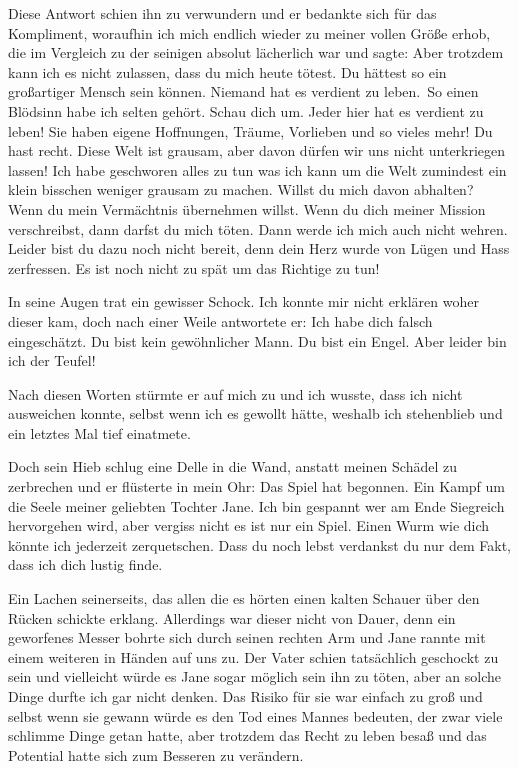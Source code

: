 \documentclass[11pt, a5paper]{article}
\newcommand{\te}{Jane } %
\newcommand{\Te}{Jane} %
\newcommand{\nL}{Niemand hat es verdient zu leben.}
\begin{document}
\begin{spacing}{1.2}
		 Diese Antwort schien ihn zu verwundern und er bedankte sich für das Kompliment, woraufhin ich mich endlich wieder zu meiner vollen Größe erhob, die im Vergleich zu der seinigen absolut lächerlich war und sagte: \frqq Aber trotzdem kann ich es nicht zulassen, dass du mich heute tötest. Du hättest so ein großartiger Mensch sein können. \nL\ So einen Blödsinn habe ich selten gehört. Schau dich um. Jeder hier hat es verdient zu leben! Sie haben eigene Hoffnungen, Träume, Vorlieben und so vieles mehr! Du hast recht. Diese Welt ist grausam, aber davon dürfen wir uns nicht unterkriegen lassen! Ich habe geschworen alles zu tun was ich kann um die Welt zumindest ein klein bisschen weniger grausam zu machen. Willst du mich davon abhalten? Wenn du mein Vermächtnis übernehmen willst. Wenn du dich meiner Mission verschreibst, dann darfst du mich töten. Dann werde ich mich auch nicht wehren. Leider bist du dazu noch nicht bereit, denn dein Herz wurde von Lügen und Hass zerfressen. Es ist noch nicht zu spät um das Richtige zu tun!\flqq
		 
		 In seine Augen trat ein gewisser Schock. Ich konnte mir nicht erklären woher dieser kam, doch nach einer Weile antwortete er: \frqq Ich habe dich falsch eingeschätzt. Du bist kein gewöhnlicher Mann. Du bist ein Engel. Aber leider bin ich der Teufel!\flqq
		 
		 Nach diesen Worten stürmte er auf mich zu und ich wusste, dass ich nicht  ausweichen konnte, selbst wenn ich es gewollt hätte, weshalb ich stehenblieb und ein letztes Mal tief einatmete.
		 
		 Doch sein Hieb schlug eine Delle in die Wand, anstatt meinen Schädel zu zerbrechen und er flüsterte in mein Ohr: \frqq Das Spiel hat begonnen. Ein Kampf um die Seele meiner geliebten Tochter \Te . Ich bin gespannt wer am Ende Siegreich hervorgehen wird, aber vergiss nicht es ist nur ein Spiel. Einen Wurm wie dich könnte ich jederzeit zerquetschen. Dass du noch lebst verdankst du nur dem Fakt, dass ich dich lustig finde.\flqq
		 
		 Ein Lachen seinerseits, das allen die es hörten einen kalten Schauer über den Rücken schickte erklang. Allerdings war dieser nicht von Dauer, denn ein geworfenes Messer bohrte sich durch seinen rechten Arm und \te rannte mit einem weiteren in Händen auf uns zu. Der Vater schien tatsächlich geschockt zu sein und vielleicht würde es \te sogar möglich sein ihn zu töten, aber an solche Dinge durfte ich gar nicht denken. Das Risiko für sie war einfach zu groß und selbst wenn sie gewann würde es den Tod eines Mannes bedeuten, der zwar viele schlimme Dinge getan hatte, aber trotzdem das Recht zu leben besaß und das Potential hatte sich zum Besseren zu verändern.
		 

\end{spacing}
\end{document}
